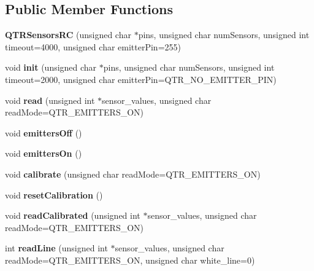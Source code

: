 \subsection*{Public Member Functions}
\begin{DoxyCompactItemize}
\item 
\mbox{\label{class_q_t_r_sensors_r_c_a4e47ceb8ad4d85df3b9fe2e9f40846c9}} 
{\bfseries Q\+T\+R\+Sensors\+RC} (unsigned char $\ast$pins, unsigned char num\+Sensors, unsigned int timeout=4000, unsigned char emitter\+Pin=255)
\item 
\mbox{\label{class_q_t_r_sensors_r_c_a354e7064c224b6fb363405016cdf73fa}} 
void {\bfseries init} (unsigned char $\ast$pins, unsigned char num\+Sensors, unsigned int timeout=2000, unsigned char emitter\+Pin=Q\+T\+R\+\_\+\+N\+O\+\_\+\+E\+M\+I\+T\+T\+E\+R\+\_\+\+P\+IN)
\item 
\mbox{\label{class_q_t_r_sensors_afc47e6c2608293a610e1a3acce93628b}} 
void {\bfseries read} (unsigned int $\ast$sensor\+\_\+values, unsigned char read\+Mode=Q\+T\+R\+\_\+\+E\+M\+I\+T\+T\+E\+R\+S\+\_\+\+ON)
\item 
\mbox{\label{class_q_t_r_sensors_a576f1fe1e9f2d3d2097baf79a9655134}} 
void {\bfseries emitters\+Off} ()
\item 
\mbox{\label{class_q_t_r_sensors_a79f5380ecdb324a7800a045c3506975f}} 
void {\bfseries emitters\+On} ()
\item 
\mbox{\label{class_q_t_r_sensors_ac9840e2429c7a962977057ba154c77da}} 
void {\bfseries calibrate} (unsigned char read\+Mode=Q\+T\+R\+\_\+\+E\+M\+I\+T\+T\+E\+R\+S\+\_\+\+ON)
\item 
\mbox{\label{class_q_t_r_sensors_aa840b6ef17562d41edf21ddd08e0672e}} 
void {\bfseries reset\+Calibration} ()
\item 
\mbox{\label{class_q_t_r_sensors_aa32a448ac03cd2a45d1f14f96ac4b739}} 
void {\bfseries read\+Calibrated} (unsigned int $\ast$sensor\+\_\+values, unsigned char read\+Mode=Q\+T\+R\+\_\+\+E\+M\+I\+T\+T\+E\+R\+S\+\_\+\+ON)
\item 
\mbox{\label{class_q_t_r_sensors_ac84f0b98bceae0b59d687ae82eb92718}} 
int {\bfseries read\+Line} (unsigned int $\ast$sensor\+\_\+values, unsigned char read\+Mode=Q\+T\+R\+\_\+\+E\+M\+I\+T\+T\+E\+R\+S\+\_\+\+ON, unsigned char white\+\_\+line=0)
\end{DoxyCompactItemize}
